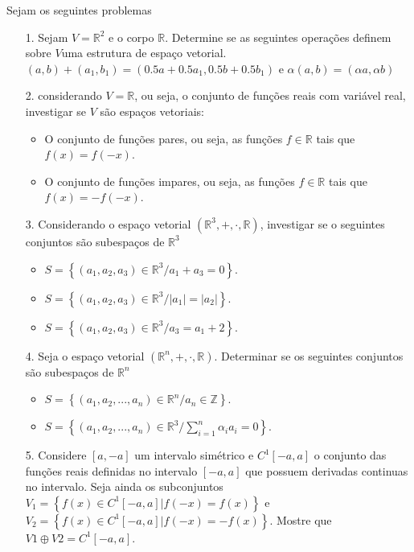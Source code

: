Sejam os seguintes problemas

\begin{itemize}
	\item[1.] Sejam $V=\mathbb{R}^{2}$ e o corpo $\mathbb{R}$. Determine se as seguintes operações definem sobre $V$uma estrutura de espaço vetorial.
	$(a,b)+(a_{1},b_{1})=(0.5a+0.5a_{1},0.5b+0.5b_{1})$ e $\alpha(a,b)=(\alpha a, \alpha b)$ 
\end{itemize}
\begin{itemize}
	\item[2.] considerando $V=\mathbb{R}$, ou seja, o conjunto de funções reais com variável real, investigar se $V$ são espaços vetoriais:
	\begin{itemize}
		\item O conjunto de funções pares, ou seja, as funções $f\in \mathbb{R}$ tais que $f(x)=f(-x)$.
		\item O conjunto de funções impares, ou seja, as funções $f\in \mathbb{R}$ tais que $f(x)=-f(-x)$.
	\end{itemize}
\end{itemize}
\begin{itemize}
	\item [3.] Considerando o espaço vetorial $(\mathbb{R}^{3},+,\cdot, \mathbb{R})$, investigar se o seguintes conjuntos são subespaços de $\mathbb{R}^{3}$
	\begin{itemize}
		\item $S=\left\lbrace (a_{1}, a_{2},a_{3})\in \mathbb{R}^{3} / a_{1}+a_{3}=0 \right\rbrace $.
		\item $S=\left\lbrace (a_{1}, a_{2},a_{3})\in \mathbb{R}^{3} / \left| a_{1}\right| =\left| a_{2}\right| \right\rbrace $.
		\item $S=\left\lbrace (a_{1}, a_{2},a_{3})\in \mathbb{R}^{3} / a_{3}= a_{1}+2\right\rbrace $.
	\end{itemize}
\end{itemize}
\begin{itemize}
	\item[4.] Seja o espaço vetorial $(\mathbb{R}^{n},+,\cdot, \mathbb{R})$. Determinar se os seguintes conjuntos são subespaços de $\mathbb{R}^{n}$
	\begin{itemize}
	\item $S=\left\lbrace (a_{1}, a_{2},...,a_{n})\in \mathbb{R}^{n} / a_{n}\in\mathbb{Z}  \right\rbrace $.
	\item $S=\left\lbrace (a_{1}, a_{2},...,a_{n})\in \mathbb{R}^{3} / \sum_{i=1}^{n}\alpha_{i}a_{i}=0 \right\rbrace $.
\end{itemize}
\end{itemize}
\begin{itemize}
	\item[5.] Considere $[a,-a]$ um intervalo simétrico e $C^{1}[-a,a]$ o conjunto das funções reais definidas no intervalo $[-a,a]$ que possuem derivadas continuas no intervalo. Seja ainda os subconjuntos $V_{1}=\left\lbrace f(x)\in C^{1}[-a,a]| f(-x)=f(x) \right\rbrace $ e $V_{2}=\left\lbrace f(x)\in C^{1}[-a,a]| f(-x)=-f(x)\right\rbrace $. Mostre que $V1\oplus V2=C^{1}[-a,a]$.
\end{itemize}

